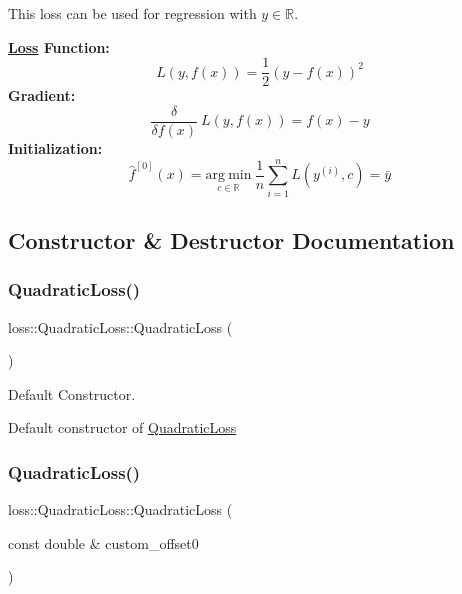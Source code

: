 This loss can be used for regression with $y \in \mathbb{R}$.

{\bfseries \mbox{\hyperlink{classloss_1_1_loss}{Loss}} Function\+:} \[ L(y, f(x)) = \frac{1}{2}\left( y - f(x) \right)^2 \] {\bfseries Gradient\+:} \[ \frac{\delta}{\delta f(x)}\ L(y, f(x)) = f(x) - y \] {\bfseries Initialization\+:} \[ \hat{f}^{[0]}(x) = \underset{c\in\mathbb{R}}{\mathrm{arg~min}}\ \frac{1}{n}\sum\limits_{i=1}^n L\left(y^{(i)}, c\right) = \bar{y} \] 

\subsection{Constructor \& Destructor Documentation}
\mbox{\label{classloss_1_1_quadratic_loss_acf4a3be5ab3c3aa4d574748c8864bacd}} 
\subsubsection{\texorpdfstring{Quadratic\+Loss()}{QuadraticLoss()}\hspace{0.1cm}{\footnotesize\ttfamily [1/2]}}
{\footnotesize\ttfamily loss\+::\+Quadratic\+Loss\+::\+Quadratic\+Loss (\begin{DoxyParamCaption}{ }\end{DoxyParamCaption})}



Default Constructor. 

Default constructor of {\ttfamily \mbox{\hyperlink{classloss_1_1_quadratic_loss}{Quadratic\+Loss}}} \mbox{\label{classloss_1_1_quadratic_loss_a41fd44734dc6d4f4189e02c79bcf4095}} 
\subsubsection{\texorpdfstring{Quadratic\+Loss()}{QuadraticLoss()}\hspace{0.1cm}{\footnotesize\ttfamily [2/2]}}
{\footnotesize\ttfamily loss\+::\+Quadratic\+Loss\+::\+Quadratic\+Loss (\begin{DoxyParamCaption}\item[{const double \&}]{custom\+\_\+offset0 }\end{DoxyParamCaption})}



